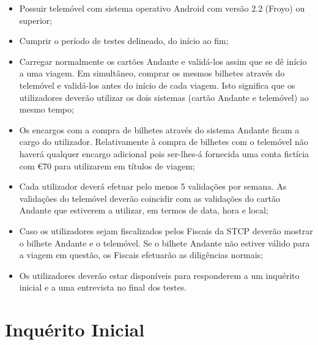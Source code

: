 \begin{itemize}
\item Possuir telemóvel com sistema operativo Android com versão 2.2 (Froyo) ou superior;
\item Cumprir o período de testes delineado, do início ao fim;
\item Carregar normalmente os cartões Andante e validá-los assim que se dê início a uma viagem. Em simultâneo, comprar os mesmos bilhetes através do telemóvel e validá-los antes do início de cada viagem. Isto significa que os utilizadores deverão utilizar os dois sistemas (cartão Andante e telemóvel) ao mesmo tempo;
\item Os encargos com a compra de bilhetes através do sistema Andante ficam a cargo do utilizador. Relativamente à compra de bilhetes com o telemóvel não haverá qualquer encargo adicional pois ser-lhes-á fornecida uma conta fictícia com  \euro 70 para utilizarem em títulos de viagem;
\item Cada utilizador deverá efetuar pelo menos 5 validações por semana. As validações do telemóvel deverão coincidir com as validações do cartão Andante que estiverem a utilizar, em termos de data, hora e local;
\item Caso os utilizadores sejam fiscalizados pelos Fiscais da STCP deverão mostrar o bilhete Andante e o telemóvel. Se o bilhete Andante não estiver válido para a viagem em questão, os Fiscais efetuarão as diligências normais;
\item Os utilizadores deverão estar disponíveis para responderem a um inquérito inicial e a uma entrevista no final dos testes.
\end{itemize}

\section{Inquérito Inicial}

